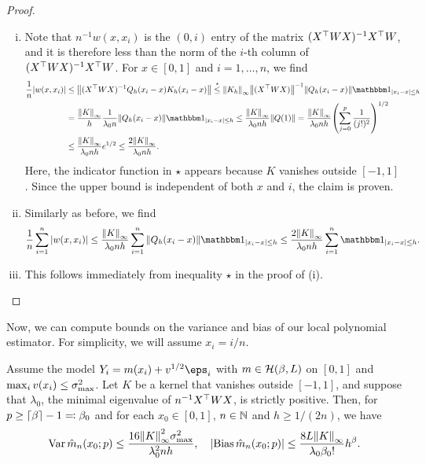 \begin{proof}
	\begin{enumerate}[(i)]
		\item
	Note that $n^{-1} w(x, x_i)$ is the $(0, i)$ entry of the matrix $(X^\top W X)^{-1} X^\top W$, and it is therefore less than the norm of the $i$-th column of $(X^\top W X)^{-1} X^\top W$.  For $x \in [0, 1]$ and $i = 1, \dotsc, n$, we find
	\begin{align*}
		\frac1n \abs{w(x, x_i)} &\leq \norm{(X\T W X)^{-1} Q_h(x_i - x) K_h(x_i - x)} \overset\star\leq  \norm{K_h}_\infty \norm{(X\T W X)}^{-1} \norm{Q_h(x_i - x)} \ind_{\abs{x_i - x} \leq h} \\
		&= \frac{\norm{K}_\infty}{h} \frac{1}{\lambda_0 n}\norm{Q_h(x_i - x)} \ind_{\abs{x_i - x} \leq h}  \leq \frac{\norm{K}_\infty}{\lambda_0 n h} \norm{Q(1)} = \frac{\norm{K}_\infty}{\lambda_0 n h} \qty(\sum_{j=0}^p \frac1{(j!)^2})^{1/2} \\
		&\leq \frac{\norm{K}_\infty}{\lambda_0 n h} e^{1/2} \leq \frac{2 \norm{K}_\infty}{\lambda_0 nh}. 
	\end{align*}
	Here, the indicator function in $\star$ appears because $K$ vanishes outside $[-1, 1]$. 
	Since the upper bound is independent of both $x$ and $i$, the claim is proven. 
	
	\item Similarly as before, we find 
	\[
	\frac1n \sum_{i=1}^n \abs{w(x, x_i)} \leq \frac{\norm{K}_\infty}{\lambda_0 n h} \sum_{i=1}^n \norm{Q_h(x_i - x)} \ind_{\abs{x_i - x} \leq h} \leq \frac{2 \norm{K}_\infty}{\lambda_0 n h} \sum_{i=1}^n \ind_{\abs{x_i - x} \leq h}. 
	\]
	
	\item This follows immediately from inequality $\star$ in the proof of (i). 

	\end{enumerate}
\end{proof}

Now, we can compute bounds on the variance and bias of our local polynomial estimator. For simplicity, we will assume $x_i = i/n$. 
\begin{proposition}
Assume the model $Y_i = m(x_i) + v^{1/2}\eps_i$ with $m \in \mathcal H(\beta, L)$ on $[0, 1]$ and $\max_i v(x_i) \leq \sigma_\mathrm{max}^2$. Let $K$ be a kernel that vanishes outside $[-1, 1]$, and suppose that $\lambda_0$, the minimal eigenvalue of $n^{-1} X^\top W X$, is strictly positive. Then, for $p \geq \lceil\beta\rceil - 1 \eqqcolon \beta_0$ and for each $x_0 \in [0, 1]$, $n \in \mathbb N$ and $h \geq 1/(2n)$, we have 
\[
\operatorname{Var} \hat m_n(x_0;p) \leq \frac{16 \norm{K}_\infty^2\sigma_\mathrm{max}^2}{\lambda_0^2 n h}, \quad \abs{\operatorname{Bias} \hat m_n(x_0;p)} \leq \frac{8L \norm{K}_\infty}{\lambda_0 \beta_0!} h^\beta. 
\]
\end{proposition}


